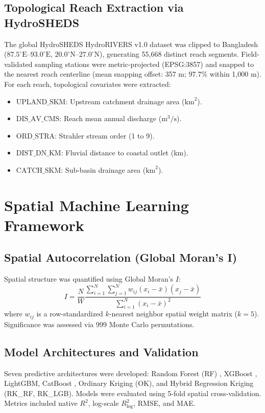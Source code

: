 \documentclass[conference]{IEEEtran}
\begin{document}
\subsection{Topological Reach Extraction via HydroSHEDS}
The global HydroSHEDS HydroRIVERS v1.0 dataset \cite{Lehner2013} was clipped to Bangladesh ($87.5^\circ\text{E}$--$93.0^\circ\text{E}$, $20.0^\circ\text{N}$--$27.0^\circ\text{N}$), generating 55,668 distinct reach segments. Field-validated sampling stations were metric-projected (EPSG:3857) and snapped to the nearest reach centerline (mean snapping offset: 357 m; 97.7\% within 1,000 m). For each reach, topological covariates were extracted:
\begin{itemize}
    \item $\text{UPLAND\_SKM}$: Upstream catchment drainage area ($\text{km}^2$).
    \item $\text{DIS\_AV\_CMS}$: Reach mean annual discharge ($\text{m}^3/\text{s}$).
    \item $\text{ORD\_STRA}$: Strahler stream order (1 to 9).
    \item $\text{DIST\_DN\_KM}$: Fluvial distance to coastal outlet (km).
    \item $\text{CATCH\_SKM}$: Sub-basin drainage area ($\text{km}^2$).
\end{itemize}

\section{Spatial Machine Learning Framework}

\subsection{Spatial Autocorrelation (Global Moran's I)}
Spatial structure was quantified using Global Moran's $I$:
\begin{equation}
I = \frac{N}{W} \frac{\sum_{i=1}^N \sum_{j=1}^N w_{ij} (x_i - \bar{x})(x_j - \bar{x})}{\sum_{i=1}^N (x_i - \bar{x})^2}
\end{equation}
where $w_{ij}$ is a row-standardized $k$-nearest neighbor spatial weight matrix ($k=5$). Significance was assessed via 999 Monte Carlo permutations.

\subsection{Model Architectures and Validation}
Seven predictive architectures were developed: Random Forest (RF) \cite{Breiman2001}, XGBoost \cite{Chen2016}, LightGBM, CatBoost \cite{Prokhorenkova2018}, Ordinary Kriging (OK), and Hybrid Regression Kriging (RK\_RF, RK\_LGB). Models were evaluated using 5-fold spatial cross-validation. Metrics included native $R^2$, log-scale $R^2_{\log}$, RMSE, and MAE.
\end{document}
